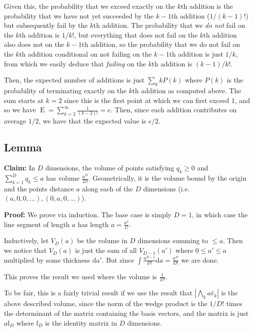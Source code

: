 \documentclass[12pt]{report}
\newcommand*{\abs}[1]{\left|#1\right|}
\DeclareMathOperator{\E}{E}
\begin{document}
Given this, the probability that we exceed exactly on the $k$th addition is the
probability that we have not yet succeeded by the $k-1$th addition ($1/(k-1)!$)
but subsequently fail by the $k$th addition. The probability that we \emph{do
not} fail on the $k$th addition is $1/k!$, but everything that does not fail on
the $k$th addition also does not on the $k-1$th addition, so the probability
that we do not fail on the $k$th addition conditional on not failing on the
$k-1$th addition is just $1/k$, from which we easily deduce that \emph{failing}
on the $k$th addition is $(k-1)/k!$.

Then, the expected number of additions is just $\sum\limits_{k}^{} k P(k)$ where
$P(k)$ is the probability of terminating exactly on the $k$th addition as
computed above. The sum starts at $k=2$ since this is the first point at which
we can first exceed $1$, and so we have $\E =
\sum\limits_{k=2}^{\infty}\frac{1}{(k - 2)!} = e$. Then, since each addition
contributes on average $1/2$, we have that the expected value is $e/2$.

\subsection{Lemma}

\textbf{Claim:} In $D$ dimensions, the volume of points satisfying $q_k \geq 0$
and $\sum\limits_{k=1}^{D} q_k \leq a$ has volume $\frac{a^D}{D!}$.
Geometrically, it is the volume bound by the origin and the points distance $a$
along each of the $D$ dimensions (i.e.\ $(a,0,0,\dots), (0,a,0,\dots)$).

\textbf{Proof:} We prove via induction. The base case is simply $D=1$, in which
case the line segment of length $a$ has length $a = \frac{a^1}{1!}$.

Inductively, let $V_D(a)$ be the volume in $D$ dimensions summing to $\leq a$.
Then we notice that $V_D(a)$ is just the sum of all $V_{D - 1}(a')$ where $0
\leq a' \leq a$ multiplied by some thickness $\mathrm{d}a'$. But since $\int
\frac{a^{D - 1}}{D!} \mathrm{d}a = \frac{a^D}{D!}$ we are done.

This proves the result we used where the volume is $\frac{1}{D!}$.

To be fair, this is a fairly trivial result if we use the result that
$\abs{\bigwedge_k a\hat{e}_k}$ is the above described volume, since the norm of
the wedge product is the $1/D!$ times the determinant of the matrix containing
the basis vectors, and the matrix is just $a \mathbb{I}_D$ where $\mathbb{I}_D$
is the identity matrix in $D$ dimensions.
\end{document}
